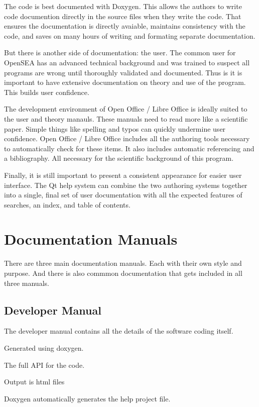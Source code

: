 The code is best documented with Doxygen. This allows the authors to write code documention directly in the source files when they write the code. That ensures the documentation is directly avaiable, maintains consistency with the code, and saves on many hours of writing and formating separate documentation.

But there is another side of documentation\-: the user. The common user for Open\-S\-E\-A has an advanced technical background and was trained to suspect all programs are wrong until thoroughly validated and documented. Thus is it is important to have extensive documentation on theory and use of the program. This builds user confidence.

The development environment of Open Office / Libre Office is ideally suited to the user and theory manauls. These manuals need to read more like a scientific paper. Simple things like spelling and typos can quickly undermine user confidence. Open Office / Libre Office includes all the authoring tools necessary to automatically check for these items. It also includes automatic referencing and a bibliography. All necessary for the scientific background of this program.

Finally, it is still important to present a consistent appearance for easier user interface. The Qt help system can combine the two authoring systems together into a single, final set of user documentation with all the expected features of searches, an index, and table of contents.\hypertarget{documentation_documentation_manuals}{}\section{Documentation Manuals}\label{documentation_documentation_manuals}
There are three main documentation manuals. Each with their own style and purpose. And there is also commmon documentation that gets included in all three manuals.\hypertarget{documentation_documentation_developer}{}\subsection{Developer Manual}\label{documentation_documentation_developer}
The developer manual contains all the details of the software coding itself.
\begin{DoxyItemize}
\item Generated using doxygen.
\item The full A\-P\-I for the code.
\item Output is html files
\item Doxygen automatically generates the help project file.
\end{DoxyItemize}

